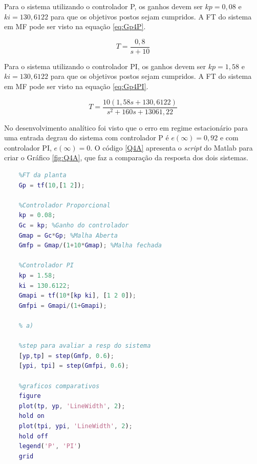  Para o sistema utilizando o controlador P, os ganhos devem ser $kp = 0,08$ e $ki = 130,6122$ para que os 
 objetivos postos sejam cumpridos. A FT do sistema em MF pode ser visto na equação \ref{eq:Gp4P}.
   
 \begin{equation}
    T =  \frac{0,8}{s+10}
    \label{eq:Gp4P}
\end{equation}
 
 Para o sistema utilizando o controlador PI, os ganhos devem ser $kp = 1,58$ e $ki = 130,6122$ para que os 
 objetivos postos sejam cumpridos. A FT do sistema em MF pode ser visto na equação \ref{eq:Gp4PI}.

    \begin{equation}
        T =  \frac{10(1,58s+130,6122)}{s^2+160s+13061,22}
        \label{eq:Gp4PI}
    \end{equation}

No desenvolvimento analítico foi visto que o erro em regime estacionário para uma entrada degrau do sistema
com controlador P é $e(\infty) = 0,92$ e com controlador PI, $e(\infty) = 0$.
O código \ref{Q4A} apresenta o \textit{script} do Matlab para criar o Gráfico \ref{fig:Q4A}, que faz a comparação da resposta
dos dois sistemas.

\begin{lstlisting}[language=Matlab,label=Q4A,caption=Análise da estabilidade]
    % a)
    %FT da planta
    Gp = tf(10,[1 2]); 
    
    %Controlador Proporcional
    kp = 0.08;
    Gc = kp; %Ganho do controlador
    Gmap = Gc*Gp; %Malha Aberta
    Gmfp = Gmap/(1+10*Gmap); %Malha fechada
    
    %Controlador PI
    kp = 1.58; 
    ki = 130.6122;
    Gmapi = tf(10*[kp ki], [1 2 0]);
    Gmfpi = Gmapi/(1+Gmapi);
    
    % a)
    
    %step para avaliar a resp do sistema
    [yp,tp] = step(Gmfp, 0.6);
    [ypi, tpi] = step(Gmfpi, 0.6);
    
    %graficos comparativos
    figure
    plot(tp, yp, 'LineWidth', 2);
    hold on
    plot(tpi, ypi, 'LineWidth', 2);
    hold off
    legend('P', 'PI')
    grid
\end{lstlisting}

